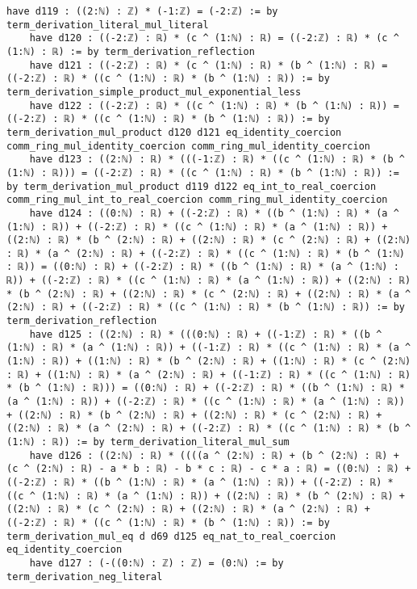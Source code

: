 \documentclass{article}
\begin{document}
\begin{tcolorbox}[colback=white!10, width=\linewidth]
\begin{lstlisting}[language=Lean4]
    have d119 : ((2:ℕ) : ℤ) * (-1:ℤ) = (-2:ℤ) := by term_derivation_literal_mul_literal
    have d120 : ((-2:ℤ) : ℝ) * (c ^ (1:ℕ) : ℝ) = ((-2:ℤ) : ℝ) * (c ^ (1:ℕ) : ℝ) := by term_derivation_reflection
    have d121 : ((-2:ℤ) : ℝ) * (c ^ (1:ℕ) : ℝ) * (b ^ (1:ℕ) : ℝ) = ((-2:ℤ) : ℝ) * ((c ^ (1:ℕ) : ℝ) * (b ^ (1:ℕ) : ℝ)) := by term_derivation_simple_product_mul_exponential_less
    have d122 : ((-2:ℤ) : ℝ) * ((c ^ (1:ℕ) : ℝ) * (b ^ (1:ℕ) : ℝ)) = ((-2:ℤ) : ℝ) * ((c ^ (1:ℕ) : ℝ) * (b ^ (1:ℕ) : ℝ)) := by term_derivation_mul_product d120 d121 eq_identity_coercion comm_ring_mul_identity_coercion comm_ring_mul_identity_coercion
    have d123 : ((2:ℕ) : ℝ) * (((-1:ℤ) : ℝ) * ((c ^ (1:ℕ) : ℝ) * (b ^ (1:ℕ) : ℝ))) = ((-2:ℤ) : ℝ) * ((c ^ (1:ℕ) : ℝ) * (b ^ (1:ℕ) : ℝ)) := by term_derivation_mul_product d119 d122 eq_int_to_real_coercion comm_ring_mul_int_to_real_coercion comm_ring_mul_identity_coercion
    have d124 : ((0:ℕ) : ℝ) + ((-2:ℤ) : ℝ) * ((b ^ (1:ℕ) : ℝ) * (a ^ (1:ℕ) : ℝ)) + ((-2:ℤ) : ℝ) * ((c ^ (1:ℕ) : ℝ) * (a ^ (1:ℕ) : ℝ)) + ((2:ℕ) : ℝ) * (b ^ (2:ℕ) : ℝ) + ((2:ℕ) : ℝ) * (c ^ (2:ℕ) : ℝ) + ((2:ℕ) : ℝ) * (a ^ (2:ℕ) : ℝ) + ((-2:ℤ) : ℝ) * ((c ^ (1:ℕ) : ℝ) * (b ^ (1:ℕ) : ℝ)) = ((0:ℕ) : ℝ) + ((-2:ℤ) : ℝ) * ((b ^ (1:ℕ) : ℝ) * (a ^ (1:ℕ) : ℝ)) + ((-2:ℤ) : ℝ) * ((c ^ (1:ℕ) : ℝ) * (a ^ (1:ℕ) : ℝ)) + ((2:ℕ) : ℝ) * (b ^ (2:ℕ) : ℝ) + ((2:ℕ) : ℝ) * (c ^ (2:ℕ) : ℝ) + ((2:ℕ) : ℝ) * (a ^ (2:ℕ) : ℝ) + ((-2:ℤ) : ℝ) * ((c ^ (1:ℕ) : ℝ) * (b ^ (1:ℕ) : ℝ)) := by term_derivation_reflection
    have d125 : ((2:ℕ) : ℝ) * (((0:ℕ) : ℝ) + ((-1:ℤ) : ℝ) * ((b ^ (1:ℕ) : ℝ) * (a ^ (1:ℕ) : ℝ)) + ((-1:ℤ) : ℝ) * ((c ^ (1:ℕ) : ℝ) * (a ^ (1:ℕ) : ℝ)) + ((1:ℕ) : ℝ) * (b ^ (2:ℕ) : ℝ) + ((1:ℕ) : ℝ) * (c ^ (2:ℕ) : ℝ) + ((1:ℕ) : ℝ) * (a ^ (2:ℕ) : ℝ) + ((-1:ℤ) : ℝ) * ((c ^ (1:ℕ) : ℝ) * (b ^ (1:ℕ) : ℝ))) = ((0:ℕ) : ℝ) + ((-2:ℤ) : ℝ) * ((b ^ (1:ℕ) : ℝ) * (a ^ (1:ℕ) : ℝ)) + ((-2:ℤ) : ℝ) * ((c ^ (1:ℕ) : ℝ) * (a ^ (1:ℕ) : ℝ)) + ((2:ℕ) : ℝ) * (b ^ (2:ℕ) : ℝ) + ((2:ℕ) : ℝ) * (c ^ (2:ℕ) : ℝ) + ((2:ℕ) : ℝ) * (a ^ (2:ℕ) : ℝ) + ((-2:ℤ) : ℝ) * ((c ^ (1:ℕ) : ℝ) * (b ^ (1:ℕ) : ℝ)) := by term_derivation_literal_mul_sum
    have d126 : ((2:ℕ) : ℝ) * ((((a ^ (2:ℕ) : ℝ) + (b ^ (2:ℕ) : ℝ) + (c ^ (2:ℕ) : ℝ) - a * b : ℝ) - b * c : ℝ) - c * a : ℝ) = ((0:ℕ) : ℝ) + ((-2:ℤ) : ℝ) * ((b ^ (1:ℕ) : ℝ) * (a ^ (1:ℕ) : ℝ)) + ((-2:ℤ) : ℝ) * ((c ^ (1:ℕ) : ℝ) * (a ^ (1:ℕ) : ℝ)) + ((2:ℕ) : ℝ) * (b ^ (2:ℕ) : ℝ) + ((2:ℕ) : ℝ) * (c ^ (2:ℕ) : ℝ) + ((2:ℕ) : ℝ) * (a ^ (2:ℕ) : ℝ) + ((-2:ℤ) : ℝ) * ((c ^ (1:ℕ) : ℝ) * (b ^ (1:ℕ) : ℝ)) := by term_derivation_mul_eq d d69 d125 eq_nat_to_real_coercion eq_identity_coercion
    have d127 : (-((0:ℕ) : ℤ) : ℤ) = (0:ℕ) := by term_derivation_neg_literal

\end{lstlisting}
\end{tcolorbox}
\end{document}
